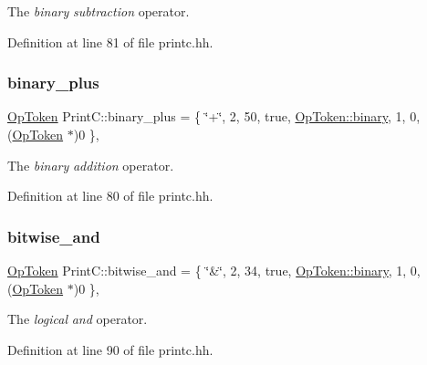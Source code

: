 The {\itshape binary} {\itshape subtraction} operator. 



Definition at line 81 of file printc.\+hh.

\mbox{\label{class_print_c_a17d2d8af95be1fddc38c0bf50be81793}} 
\subsubsection{\texorpdfstring{binary\_plus}{binary\_plus}}
{\footnotesize\ttfamily \mbox{\hyperlink{class_op_token}{Op\+Token}} Print\+C\+::binary\+\_\+plus = \{ \char`\"{}+\char`\"{}, 2, 50, true, \mbox{\hyperlink{class_op_token_af41c7f108d5662ede7765c5a6c44eaffa3a2ec63522a9329a71ddbe8adc3e752d}{Op\+Token\+::binary}}, 1, 0, (\mbox{\hyperlink{class_op_token}{Op\+Token}} $\ast$)0 \}\hspace{0.3cm}{\ttfamily [static]}, {\ttfamily [protected]}}



The {\itshape binary} {\itshape addition} operator. 



Definition at line 80 of file printc.\+hh.

\mbox{\label{class_print_c_a86216e1cf58cbe570445e93e3adc64ac}} 
\subsubsection{\texorpdfstring{bitwise\_and}{bitwise\_and}}
{\footnotesize\ttfamily \mbox{\hyperlink{class_op_token}{Op\+Token}} Print\+C\+::bitwise\+\_\+and = \{ \char`\"{}\&\char`\"{}, 2, 34, true, \mbox{\hyperlink{class_op_token_af41c7f108d5662ede7765c5a6c44eaffa3a2ec63522a9329a71ddbe8adc3e752d}{Op\+Token\+::binary}}, 1, 0, (\mbox{\hyperlink{class_op_token}{Op\+Token}} $\ast$)0 \}\hspace{0.3cm}{\ttfamily [static]}, {\ttfamily [protected]}}



The {\itshape logical} {\itshape and} operator. 



Definition at line 90 of file printc.\+hh.

\mbox{\label{class_print_c_a176b30b5cecd9879b0dadd0dcc628068}} 
